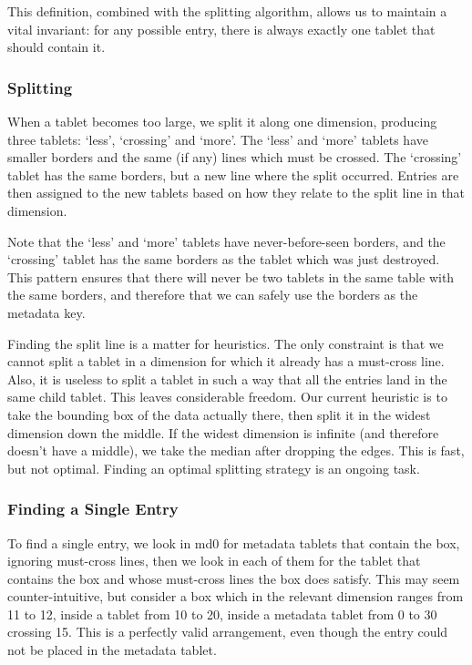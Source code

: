 \documentclass[11pt]{article}
\begin{document}
This definition, combined with the splitting algorithm, allows us to maintain a vital invariant: for any possible entry, there is always exactly one tablet that should contain it.

\subsubsection{Splitting}

When a tablet becomes too large, we split it along one dimension, producing three tablets: `less', `crossing' and `more'. The `less' and `more' tablets have smaller borders and the same (if any) lines which must be crossed. The `crossing' tablet has the same borders, but a new line where the split occurred. Entries are then assigned to the new tablets based on how they relate to the split line in that dimension.

Note that the `less' and `more' tablets have never-before-seen borders, and the `crossing' tablet has the same borders as the tablet which was just destroyed. This pattern ensures that there will never be two tablets in the same table with the same borders, and therefore that we can safely use the borders as the metadata key.

Finding the split line is a matter for heuristics. The only constraint is that we cannot split a tablet in a dimension for which it already has a must-cross line. Also, it is useless to split a tablet in such a way that all the entries land in the same child tablet. This leaves considerable freedom. Our current heuristic is to take the bounding box of the data actually there, then split it in the widest dimension down the middle. If the widest dimension is infinite (and therefore doesn't have a middle), we take the median after dropping the edges. This is fast, but not optimal. Finding an optimal splitting strategy is an ongoing task.

\subsubsection{Finding a Single Entry}

To find a single entry, we look in md0 for metadata tablets that contain the box, ignoring must-cross lines, then we look in each of them for the tablet that contains the box and whose must-cross lines the box does satisfy. This may seem counter-intuitive, but consider a box which in the relevant dimension ranges from 11 to 12, inside a tablet from 10 to 20, inside a metadata tablet from 0 to 30 crossing 15. This is a perfectly valid arrangement, even though the entry could not be placed in the metadata tablet.
\end{document}

